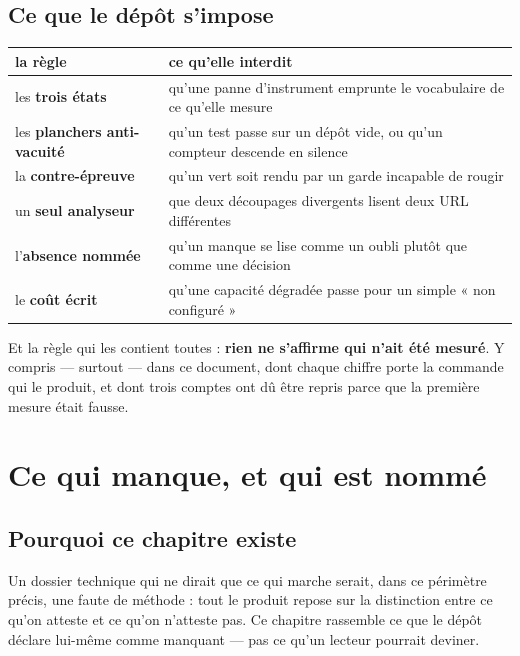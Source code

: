 \documentclass[10pt]{report}
\begin{document}
\section{Ce que le dépôt s'impose}

\begin{longtable}{@{}p{5.0cm}p{10.0cm}@{}}
\toprule \textbf{la règle} & \textbf{ce qu'elle interdit} \\ \midrule \endhead
les \textbf{trois états} & qu'une panne d'instrument emprunte le vocabulaire de ce qu'elle mesure \\
les \textbf{planchers anti-vacuité} & qu'un test passe sur un dépôt vide, ou qu'un compteur descende en silence \\
la \textbf{contre-épreuve} & qu'un vert soit rendu par un garde incapable de rougir \\
un \textbf{seul analyseur} & que deux découpages divergents lisent deux URL différentes \\
l'\textbf{absence nommée} & qu'un manque se lise comme un oubli plutôt que comme une décision \\
le \textbf{coût écrit} & qu'une capacité dégradée passe pour un simple « non configuré » \\
\bottomrule
\end{longtable}

\begin{acquis}
Et la règle qui les contient toutes : \textbf{rien ne s'affirme qui n'ait été mesuré}. Y compris ---
surtout --- dans ce document, dont chaque chiffre porte la commande qui le produit, et dont trois
comptes ont dû être repris parce que la première mesure était fausse.
\end{acquis}


\chapter{Ce qui manque, et qui est nommé}

\section{Pourquoi ce chapitre existe}

Un dossier technique qui ne dirait que ce qui marche serait, dans ce périmètre précis, une faute de
méthode : tout le produit repose sur la distinction entre ce qu'on atteste et ce qu'on n'atteste pas.
Ce chapitre rassemble ce que le dépôt déclare lui-même comme manquant --- pas ce qu'un lecteur
pourrait deviner.
\end{document}
